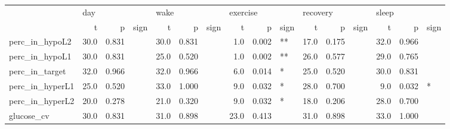 \begin{tabular}{lrrlrrlrrlrrlrrl}
\toprule
{} & \multicolumn{3}{l}{day} & \multicolumn{3}{l}{wake} & \multicolumn{3}{l}{exercise} & \multicolumn{3}{l}{recovery} & \multicolumn{3}{l}{sleep} \\
{} &     t &      p & sign &     t &      p & sign &        t &      p & sign &        t &      p & sign &     t &      p & sign \\
\midrule
perc_in_hypoL2  &  30.0 &  0.831 &      &  30.0 &  0.831 &      &      1.0 &  0.002 &   ** &     17.0 &  0.175 &      &  32.0 &  0.966 &      \\
perc_in_hypoL1  &  30.0 &  0.831 &      &  25.0 &  0.520 &      &      1.0 &  0.002 &   ** &     26.0 &  0.577 &      &  29.0 &  0.765 &      \\
perc_in_target  &  32.0 &  0.966 &      &  32.0 &  0.966 &      &      6.0 &  0.014 &    * &     25.0 &  0.520 &      &  30.0 &  0.831 &      \\
perc_in_hyperL1 &  25.0 &  0.520 &      &  33.0 &  1.000 &      &      9.0 &  0.032 &    * &     28.0 &  0.700 &      &   9.0 &  0.032 &    * \\
perc_in_hyperL2 &  20.0 &  0.278 &      &  21.0 &  0.320 &      &      9.0 &  0.032 &    * &     18.0 &  0.206 &      &  28.0 &  0.700 &      \\
glucose_cv      &  30.0 &  0.831 &      &  31.0 &  0.898 &      &     23.0 &  0.413 &      &     31.0 &  0.898 &      &  33.0 &  1.000 &      \\
\bottomrule
\end{tabular}
